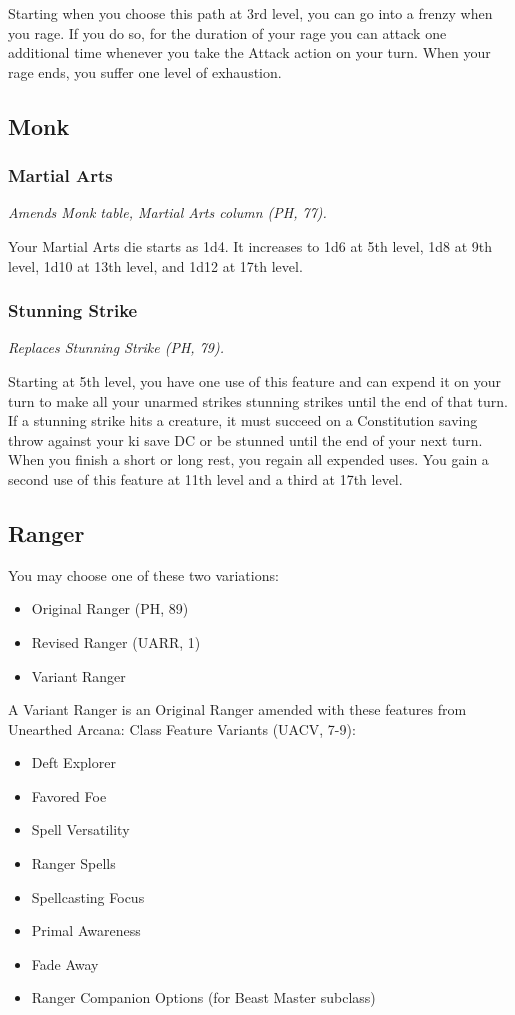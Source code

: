 \documentclass[letterpaper,twocolumn,openany,nodeprecatedcode]{dndbook}
\begin{document}
Starting when you choose this path at 3rd level, you can go into a frenzy when you rage. If you do so, for the duration of your rage you can attack one additional time whenever you take the Attack action on your turn. When your rage ends, you suffer one level of exhaustion.

\subsection{Monk}

\subsubsection{Martial Arts}
\textit{Amends Monk table, Martial Arts column (PH, 77).}

Your Martial Arts die starts as 1d4. It increases to 1d6 at 5th level, 1d8 at 9th level, 1d10 at 13th level, and 1d12 at 17th level.

\subsubsection{Stunning Strike}
\textit{Replaces Stunning Strike (PH, 79).}

Starting at 5th level, you have one use of this feature and can expend it on your turn to make all your unarmed strikes stunning strikes until the end of that turn. If a stunning strike hits a creature, it must succeed on a Constitution saving throw against your ki save DC or be stunned until the end of your next turn. When you finish a short or long rest, you regain all expended uses. You gain a second use of this feature at 11th level and a third at 17th level. 
\subsection{Ranger}

You may choose one of these two variations:

\begin{itemize}
    \item Original Ranger (PH, 89)
    \item Revised Ranger (UARR, 1)
    \item Variant Ranger
\end{itemize}

A Variant Ranger is an Original Ranger amended with these features from Unearthed Arcana: Class Feature Variants (UACV, 7-9):

\begin{itemize}
    \item Deft Explorer
    \item Favored Foe
    \item Spell Versatility
    \item Ranger Spells
    \item Spellcasting Focus
    \item Primal Awareness
    \item Fade Away
    \item Ranger Companion Options (for Beast Master subclass)
\end{itemize}
\end{document}

